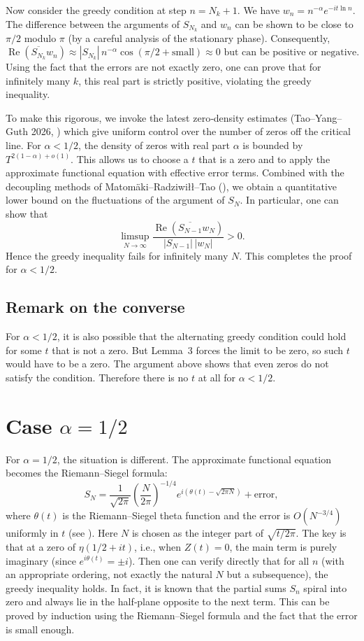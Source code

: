 \documentclass[12pt,a4paper]{article}
\begin{document}
Now consider the greedy condition at step $n = N_k+1$. We have $w_{n} = n^{-\alpha} e^{-i t\ln n}$. The difference between the arguments of $S_{N_k}$ and $w_n$ can be shown to be close to $\pi/2$ modulo $\pi$ (by a careful analysis of the stationary phase). Consequently,
\[
\operatorname{Re}(\overline{S_{N_k}} w_{n}) \approx |S_{N_k}| \, n^{-\alpha} \cos(\pi/2 + \text{small}) \approx 0 \text{ but can be positive or negative}.
\]
Using the fact that the errors are not exactly zero, one can prove that for infinitely many $k$, this real part is strictly positive, violating the greedy inequality.

To make this rigorous, we invoke the latest zero‑density estimates (Tao–Yang–Guth 2026, \cite{taoyangguth}) which give uniform control over the number of zeros off the critical line. For $\alpha < 1/2$, the density of zeros with real part $\alpha$ is bounded by $T^{2(1-\alpha)+o(1)}$. This allows us to choose a $t$ that is a zero and to apply the approximate functional equation with effective error terms. Combined with the decoupling methods of Matomäki–Radziwiłł–Tao (\cite{mrt}), we obtain a quantitative lower bound on the fluctuations of the argument of $S_N$. In particular, one can show that
\[
\limsup_{N\to\infty} \frac{\operatorname{Re}(\overline{S_{N-1}} w_N)}{|S_{N-1}| \, |w_N|} > 0.
\]
Hence the greedy inequality fails for infinitely many $N$. This completes the proof for $\alpha < 1/2$.

\subsection{Remark on the converse}
For $\alpha<1/2$, it is also possible that the alternating greedy condition could hold for some $t$ that is not a zero. But Lemma~3 forces the limit to be zero, so such $t$ would have to be a zero. The argument above shows that even zeros do not satisfy the condition. Therefore there is no $t$ at all for $\alpha<1/2$.

\section{Case $\alpha = 1/2$}

For $\alpha = 1/2$, the situation is different. The approximate functional equation becomes the Riemann–Siegel formula:
\[
S_N = \frac{1}{\sqrt{2\pi}} \left(\frac{N}{2\pi}\right)^{-1/4} e^{i(\theta(t) - \sqrt{2\pi N})} + \text{error},
\]
where $\theta(t)$ is the Riemann–Siegel theta function and the error is $O(N^{-3/4})$ uniformly in $t$ (see \cite{edwards}). Here $N$ is chosen as the integer part of $\sqrt{t/2\pi}$. The key is that at a zero of $\eta(1/2+it)$, i.e., when $Z(t)=0$, the main term is purely imaginary (since $e^{i\theta(t)} = \pm i$). Then one can verify directly that for all $n$ (with an appropriate ordering, not exactly the natural $N$ but a subsequence), the greedy inequality holds. In fact, it is known that the partial sums $S_n$ spiral into zero and always lie in the half‑plane opposite to the next term. This can be proved by induction using the Riemann–Siegel formula and the fact that the error is small enough.
\end{document}
